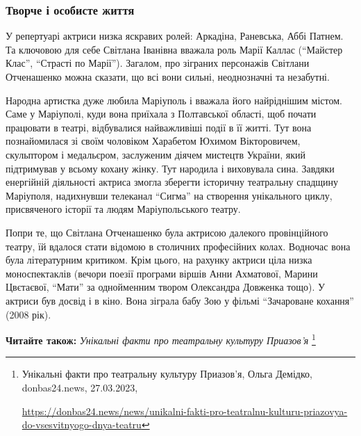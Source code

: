  
 
 
 
 

\subsubsection{Творче і особисте життя}

У репертуарі актриси низка яскравих ролей: Аркадіна, Раневська, Аббі Патнем. Та
ключовою для себе Світлана Іванівна вважала роль Марії Каллас (\enquote{Майстер Клас},
\enquote{Страсті по Марії}). Загалом, про зіграних персонажів Світлани Отченашенко
можна сказати, що всі вони сильні, неоднозначні та незабутні.


Народна артистка дуже любила Маріуполь і вважала його найріднішим містом. Саме
у Маріуполі, куди вона приїхала з Полтавської області, щоб почати працювати в
театрі, відбувалися найважливіші події в її житті. Тут вона познайомилася зі
своїм чоловіком Харабетом Юхимом Вікторовичем, скульптором і медальєром,
заслуженим діячем мистецтв України, який підтримував у всьому кохану жінку. Тут
народила і виховувала сина. Завдяки енергійній діяльності актриса змогла
зберегти історичну театральну спадщину Маріуполя, надихнувши телеканал \enquote{Сигма}
на створення унікального циклу, присвяченого історії та людям Маріупольського
театру.


Попри те, що Світлана Отченашенко була актрисою далекого провінційного театру,
їй вдалося стати відомою в столичних професійних колах. Водночас вона була
літературним критиком. Крім цього, на рахунку актриси ціла низка моноспектаклів
(вечори поезії програми віршів Анни Ахматової, Марини Цвєтаєвої, \enquote{Мати} за
однойменним твором Олександра Довженка тощо). У актриси був досвід і в кіно.
Вона зіграла бабу Зою у фільмі \enquote{Зачароване кохання} (2008 рік).

\textbf{Читайте також:} \emph{Унікальні факти про театральну культуру Приазов'я}%
\footnote{Унікальні факти про театральну культуру Приазов'я, Ольга Демідко, donbas24.news, 27.03.2023, \par%
\url{https://donbas24.news/news/unikalni-fakti-pro-teatralnu-kulturu-priazovya-do-vsesvitnyogo-dnya-teatru}
}


